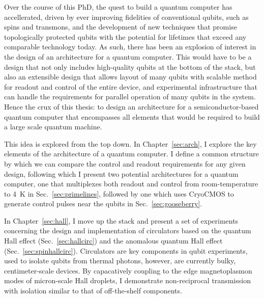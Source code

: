 %
%
%
Over the course of this PhD, the quest to build a quantum computer has accellerated, driven by ever improving
fidelities of conventional qubits, such as spins and transmons, and the development of new techniques
that promise topologically protected qubits with the potential for lifetimes that exceed any comparable
technology today. As such, there has been an explosion of interest in the design of an architecture for a
quantum computer. This would have to be a design that not only includes high-quality qubits at the bottom of the stack,
but also an extensible design that allows layout of many qubits with scalable method for readout and
control of the entire device, and experimental infrastructure that can handle the requirements for parallel operation
of many qubits in the system. Hence the crux of this thesis: to design an architecture for a semiconductor-based
quantum computer that encompasses all elements that would be required to build a large scale quantum machine.

This idea is explored from the top down. In Chapter~\ref{sec:arch}, I explore the key elements of
the architecture of a quantum computer. I define a common structure by which we can compare the control
and readout requirements for any given design, following which I present two potential architectures for
a quantum computer, one that multiplexes both readout and control from room-temperature to \SI{4}{\kelvin} in
Sec.~\ref{sec:primelines}, followed by one which uses {CryoCMOS} to generate control pulses near the qubits
in Sec.~\ref{sec:gooseberry}.

In Chapter~\ref{sec:hall}, I move up the stack and present a set of experiments concerning the design and
implementation of circulators based on the quantum Hall effect (Sec.~\ref{sec:hallcirc}) and the
anomalous quantum Hall effect (Sec.~\ref{sec:spinhallcirc}). Circulators are key components in qubit
experiments, used to isolate qubits from thermal photons, however, are currently bulky, centimeter-scale
devices. By capacatively coupling to the edge magnetoplasmon modes of micron-scale Hall droplets,
I demonstrate non-reciprocal transmission with isolation similar to that of off-the-shelf components.

